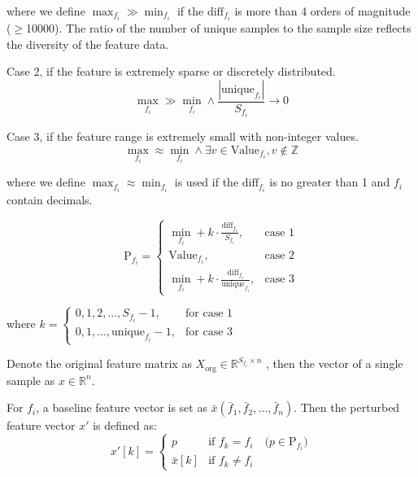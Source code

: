 \documentclass[journal]{IEEEtran}
\begin{document}
where we define $\max_{f_i} \gg \min_{f_i}$ if the $\text{diff}_{f_i}$ is more than 4 orders of magnitude ($\geq$10000). The ratio of the number of unique samples to the sample size reflects the diversity of the feature data.

Case 2, if the feature is extremely sparse or discretely distributed. 
\begin{equation}
\max_{f_i} \gg \min_{f_i} \land \frac{|\text{unique}_{f_i}|}{S_{f_i}} \to 0
\end{equation}

Case 3, if the feature range is extremely small with non-integer values. 
\begin{equation}
\max_{f_i} \approx \min_{f_i} \land  \exists v \in \text{Value}_{f_i}, v \notin \mathbb{Z} 
\end{equation}

where we define $\max_{f_i} \approx \min_{f_i}$ is used if the $\text{diff}_{f_i}$ is no greater than 1 and $f_i$ contain decimals.

\begin{equation}
\text{P}_{f_i} =
\begin{cases}
\min_{f_i} + k \cdot \frac{\text{diff}_{f_i}}{S_{f_i}}, & \text{case 1} \\
\text{Value}_{f_i}, & \text{case 2} \\
\min_{f_i} + k \cdot \frac{\text{diff}_{f_i}}{\text{unique}_{f_i}}, & \text{case 3}
\end{cases}
\label{eq:perturbation_set}
\end{equation}

where $k =
\begin{cases}
0, 1, 2, \dots, S_{f_i}-1, & \text{for case 1} \\
0, 1, \dots, \text{unique}_{f_i}-1, & \text{for case 3}
\end{cases}$

Denote the original feature matrix as $X_{\text{org}} \in \mathbb{R}^{S_{f_i} \times n}$ , then the vector of a single sample as \(x \in \mathbb{R}^{n}\). 

For $f_i$, a baseline feature vector is set as $\bar{x}$$(\bar{f}_1, \bar{f}_2, \dots, \bar{f}_n)$. Then the perturbed feature vector $x'$ is defined as:\begin{equation} x'[k] =\begin{cases}p & \text{if } f_k = f_i  \quad (p \in \text{P}_{f_i}\text{)} \\\bar{x}[k] & \text{if } f_k \neq {f_i}\end{cases}\end{equation}
\end{document}
